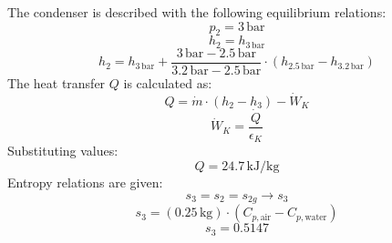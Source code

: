 The condenser is described with the following equilibrium relations:  
\[
p_2 = 3 \, \text{bar}
\]
\[
h_2 = h_{3 \, \text{bar}}
\]
\[
h_2 = h_{3 \, \text{bar}} + \frac{3 \, \text{bar} - 2.5 \, \text{bar}}{3.2 \, \text{bar} - 2.5 \, \text{bar}} \cdot (h_{2.5 \, \text{bar}} - h_{3.2 \, \text{bar}})
\]
The heat transfer \( Q \) is calculated as:  
\[
Q = \dot{m} \cdot (h_2 - h_3) - \dot{W}_K
\]
\[
\dot{W}_K = \frac{\dot{Q}}{\epsilon_K}
\]
Substituting values:  
\[
Q = 24.7 \, \text{kJ/kg}
\]
Entropy relations are given:  
\[
s_3 = s_2 = s_{2g} \rightarrow s_3
\]
\[
s_3 = (0.25 \, \text{kg}) \cdot (C_{p, \text{air}} - C_{p, \text{water}})
\]
\[
s_3 = 0.5147
\]